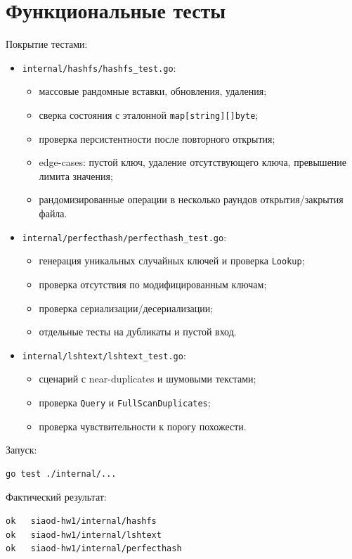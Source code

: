 \documentclass{itmo}
\begin{document}
\section{Функциональные тесты}

Покрытие тестами:
\begin{itemize}
	\item \texttt{internal/hashfs/hashfs\_test.go}: 
	\begin{itemize}
		\item массовые рандомные вставки, обновления, удаления;
		\item сверка состояния с эталонной \texttt{map[string][]byte};
		\item проверка персистентности после повторного открытия;
		\item edge-cases: пустой ключ, удаление отсутствующего ключа, превышение лимита значения;
		\item рандомизированные операции в несколько раундов открытия/закрытия файла.
	\end{itemize}
	\item \texttt{internal/perfecthash/perfecthash\_test.go}:
	\begin{itemize}
		\item генерация уникальных случайных ключей и проверка \texttt{Lookup};
		\item проверка отсутствия по модифицированным ключам;
		\item проверка сериализации/десериализации;
		\item отдельные тесты на дубликаты и пустой вход.
	\end{itemize}
	\item \texttt{internal/lshtext/lshtext\_test.go}:
	\begin{itemize}
		\item сценарий с near-duplicates и шумовыми текстами;
		\item проверка \texttt{Query} и \texttt{FullScanDuplicates};
		\item проверка чувствительности к порогу похожести.
	\end{itemize}
\end{itemize}

Запуск:
\begin{verbatim}
go test ./internal/...
\end{verbatim}

Фактический результат:
\begin{verbatim}
ok   siaod-hw1/internal/hashfs
ok   siaod-hw1/internal/lshtext
ok   siaod-hw1/internal/perfecthash
\end{verbatim}
\end{document}
